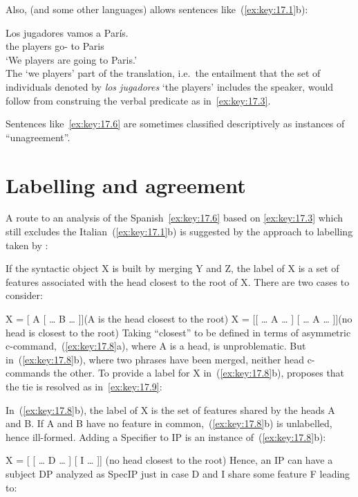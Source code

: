 \documentclass[output=paper]{langsci/langscibook}
\begin{document}
Also,  (and some other languages) allows sentences
like~(\ref{ex:key:17.1}b):

\ea\label{ex:key:17.6}
    \gll    Los jugadores vamos a París.\\
            the players      go-\Fpl{} to Paris\\
    \glt    ‘We players are going to Paris.’\\
\z
The ‘we players’ part of the translation, i.e.\ the entailment that the set of
individuals denoted by \emph{los jugadores} ‘the players’ includes the speaker,
would follow from construing the verbal predicate as in~\eqref{ex:key:17.3}.

Sentences like~\eqref{ex:key:17.6} are sometimes classified descriptively as
instances of “un\-agreement”.

\section{Labelling and agreement}\label{sec:key:17.2}

A route to an analysis of the Spanish~\eqref{ex:key:17.6} based on \eqref{ex:key:17.3} which still
excludes the Italian~(\ref{ex:key:17.1}b) is suggested by the approach to labelling
taken by \citet{Chomsky2013}:

\ea\label{ex:key:17.7}
    If the syntactic object X is built by merging Y and Z, the label of X is a set
    of features associated with the head closest to the root of X.
\z
There are two cases to consider:

\ea\label{ex:key:17.8}
    \ea X = [ A [ \dots{} B \dots{} ]]\hfill(A is the head closest to the root)
    \ex X = [[ \dots{} A \dots{} ] [ \dots{} A \dots{} ]]\hfill(no head is closest to the root)
    \z
\z
Taking “closest” to be defined in terms of asymmetric
c-command,~(\ref{ex:key:17.8}a), where A is a head, is unproblematic. But
in~(\ref{ex:key:17.8}b), where two phrases have been merged, neither head
c-commands the other. To provide a label for X in~(\ref{ex:key:17.8}b),
\textcite{Chomsky2013} proposes that the tie is resolved as
in~\eqref{ex:key:17.9}:

\ea\label{ex:key:17.9}
    \ea In~(\ref{ex:key:17.8}b), the label of X is the set of features shared by the
    heads A and B.
    \ex If A and B have no feature in common,~(\ref{ex:key:17.8}b) is unlabelled,
    hence ill-formed.
    \z
\z
Adding a Specifier to IP is an instance of~(\ref{ex:key:17.8}b):

\ea\label{ex:key:17.10}
    X = [ [ \dots{} D \dots{} ] [ I \dots{} ]] (no head closest to the root)
\z
Hence, an IP can have a subject DP analyzed as SpecIP just in case D and I
share some feature F leading to:
\end{document}
